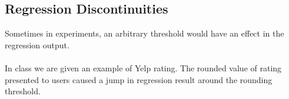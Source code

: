 \subsection{Regression Discontinuities}
Sometimes in experiments, an arbitrary threshold would have an effect in the regression output. 
\\
\\
In class we are given an example of Yelp rating. The rounded value of rating presented to users caused a jump in regression result around the rounding threshold.





